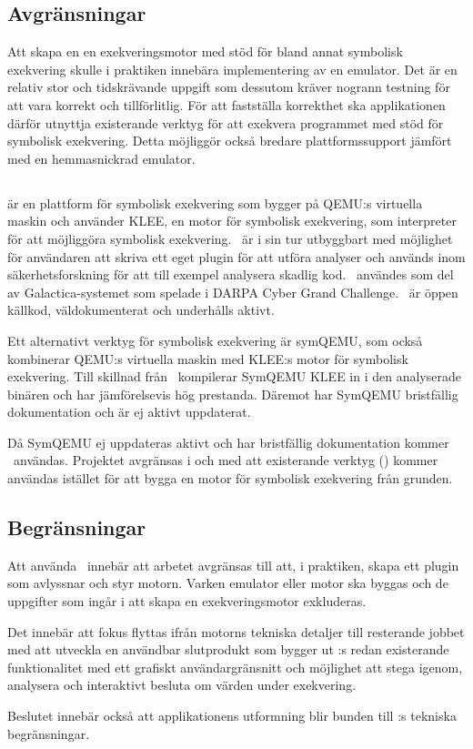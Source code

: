 \subsection{Avgränsningar}

Att skapa en en exekveringsmotor med stöd för bland annat symbolisk exekvering
skulle i praktiken innebära implementering av en emulator. Det är en relativ
stor och tidskrävande uppgift som dessutom kräver nogrann testning för att vara
korrekt och tillförlitlig. För att fastställa korrekthet ska applikationen
därför utnyttja existerande verktyg för att exekvera programmet med stöd för
symbolisk exekvering. Detta möjliggör också bredare plattformssupport jämfört
med en hemmasnickrad emulator.


\subsection{\Verktyg}

\stoe\cite{s2e} är en plattform för symbolisk exekvering som bygger på QEMU:s
virtuella maskin och använder KLEE\cite{klee}, en motor för symbolisk
exekvering, som interpreter för att möjliggöra symbolisk exekvering. \stoe\ är i
sin tur utbyggbart med möjlighet för användaren att skriva ett eget plugin för
att utföra analyser och används inom säkerhetsforskning för att till exempel
analysera skadlig kod. \stoe\ användes som del av Galactica-systemet som spelade
i DARPA Cyber Grand Challenge\cite{s2e_website}. \stoe\ är öppen källkod,
väldokumenterat och underhålls aktivt.

Ett alternativt verktyg för symbolisk exekvering är symQEMU\cite{symqemu},
som också kombinerar QEMU:s virtuella maskin med KLEE:s motor för symbolisk
exekvering. Till skillnad från \stoe\ kompilerar SymQEMU KLEE in i den
analyserade binären och har jämförelsevis hög prestanda. Däremot har SymQEMU
bristfällig dokumentation och är ej aktivt uppdaterat.

Då SymQEMU ej uppdateras aktivt och har bristfällig dokumentation kommer \stoe\
användas. Projektet avgränsas i och med att existerande verktyg (\stoe) kommer
användas istället för att bygga en motor för symbolisk exekvering från grunden.

\subsection{Begränsningar}

Att använda \stoe\ innebär att arbetet avgränsas till att, i praktiken, skapa
ett plugin som avlyssnar och styr motorn. Varken emulator eller motor ska
byggas och de uppgifter som ingår i att skapa en exekveringsmotor exkluderas.

Det innebär att fokus flyttas ifrån motorns tekniska detaljer till resterande
jobbet med att utveckla en användbar slutprodukt som bygger ut \stoe:s redan
existerande funktionalitet med ett grafiskt användargränsnitt och möjlighet att
stega igenom, analysera och interaktivt besluta om värden under exekvering.

Beslutet innebär också att applikationens utformning blir bunden till \stoe:s
tekniska begränsningar.
